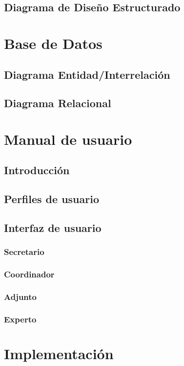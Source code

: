 \documentclass[12pt,a4paper,spanish,twoside]{article}
\begin{document}
\subsection{Diagrama de Diseño Estructurado}

\section{Base de Datos}
\subsection{Diagrama Entidad/Interrelación}
\subsection{Diagrama Relacional}

\section{Manual de usuario}
\subsection{Introducción}
\subsection{Perfiles de usuario}
\subsection{Interfaz de usuario}
\subsubsection{Secretario}
\subsubsection{Coordinador}
\subsubsection{Adjunto}
\subsubsection{Experto}

\section{Implementación}
\end{document}
